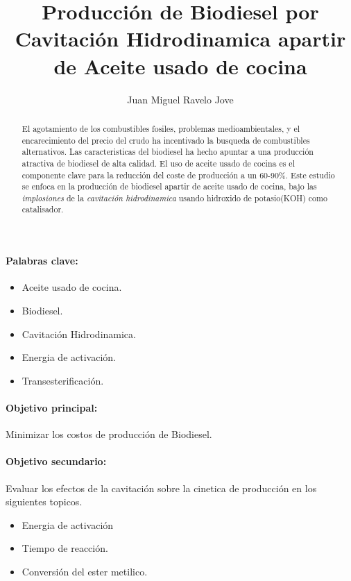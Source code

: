 \documentclass[a4paper,10pt]{article}
\title{Producción de Biodiesel por Cavitación Hidrodinamica apartir de Aceite usado de cocina}
\author{Juan Miguel Ravelo Jove}
\begin{document}
\maketitle

\begin{abstract}
El agotamiento de los combustibles fosiles, problemas medioambientales, y el encarecimiento del precio del crudo ha incentivado la busqueda de combustibles alternativos. Las caracteristicas del biodiesel ha hecho apuntar a una producción atractiva de biodiesel de alta calidad. El uso de aceite usado de cocina es el componente clave para la reducción del coste de producción a un 60-90\%. Este estudio se enfoca en la producción de biodiesel apartir de aceite usado de cocina, bajo las \emph{implosiones} de la \emph{cavitación hidrodinamica} usando hidroxido de potasio(KOH) como catalisador.
\end{abstract}

\paragraph{Palabras clave:} 
\begin{itemize}
 \item Aceite usado de cocina.
 \item Biodiesel.
 \item Cavitación Hidrodinamica.
 \item Energia de activación.
 \item Transesterificación.
\end{itemize}

\paragraph{Objetivo principal:}
Minimizar los costos de producción de Biodiesel.
\paragraph{Objetivo secundario:}
Evaluar los efectos de la cavitación sobre la cinetica de producción en los siguientes topicos.
\begin{itemize}
 \item Energia de activación
 \item Tiempo de reacción.
 \item Conversión del ester metilico.
\end{itemize}
\end{document}
